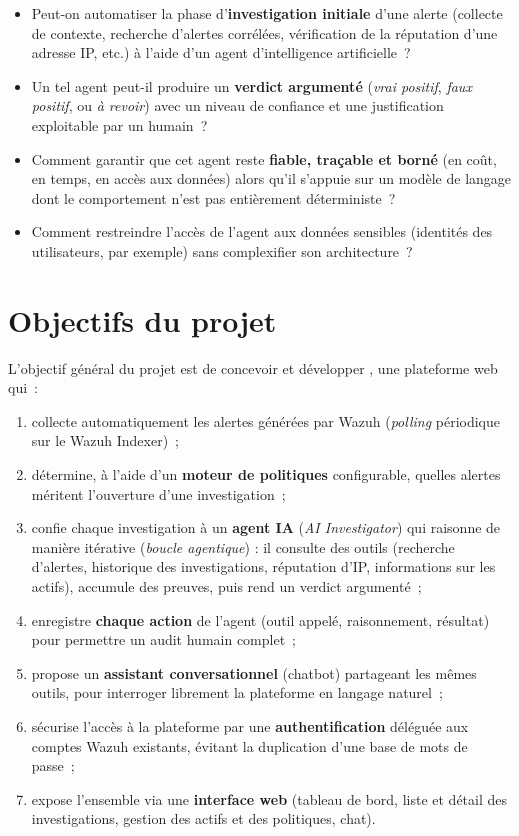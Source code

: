 \begin{itemize}
  \item Peut-on automatiser la phase d'\textbf{investigation initiale} d'une
        alerte (collecte de contexte, recherche d'alertes corrélées,
        vérification de la réputation d'une adresse IP, etc.) à l'aide d'un
        agent d'intelligence artificielle~?
  \item Un tel agent peut-il produire un \textbf{verdict argumenté}
        (\textit{vrai positif}, \textit{faux positif}, ou \textit{à revoir})
        avec un niveau de confiance et une justification exploitable par un
        humain~?
  \item Comment garantir que cet agent reste \textbf{fiable, traçable et
        borné} (en coût, en temps, en accès aux données) alors qu'il
        s'appuie sur un modèle de langage dont le comportement n'est pas
        entièrement déterministe~?
  \item Comment restreindre l'accès de l'agent aux données sensibles
        (identités des utilisateurs, par exemple) sans complexifier son
        architecture~?
\end{itemize}

\section{Objectifs du projet}

L'objectif général du projet est de concevoir et développer
\textbf{\projectname}, une plateforme web qui~:

\begin{enumerate}
  \item collecte automatiquement les alertes générées par Wazuh
        (\textit{polling} périodique sur le Wazuh Indexer)~;
  \item détermine, à l'aide d'un \textbf{moteur de politiques}
        configurable, quelles alertes méritent l'ouverture d'une
        investigation~;
  \item confie chaque investigation à un \textbf{agent IA} (\textit{AI
        Investigator}) qui raisonne de manière itérative
        (\textit{boucle agentique}) : il consulte des outils (recherche
        d'alertes, historique des investigations, réputation d'IP,
        informations sur les actifs), accumule des preuves, puis rend un
        verdict argumenté~;
  \item enregistre \textbf{chaque action} de l'agent (outil appelé,
        raisonnement, résultat) pour permettre un audit humain complet~;
  \item propose un \textbf{assistant conversationnel} (chatbot) partageant
        les mêmes outils, pour interroger librement la plateforme en
        langage naturel~;
  \item sécurise l'accès à la plateforme par une
        \textbf{authentification} déléguée aux comptes Wazuh existants,
        évitant la duplication d'une base de mots de passe~;
  \item expose l'ensemble via une \textbf{interface web} (tableau de bord,
        liste et détail des investigations, gestion des actifs et des
        politiques, chat).
\end{enumerate}


